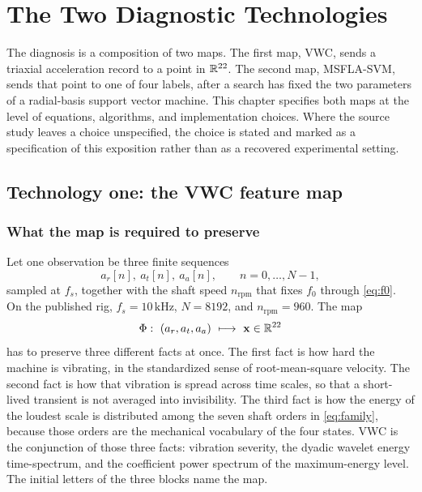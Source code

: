 \chapter{The Two Diagnostic Technologies}
\label{ch:methods}

The diagnosis is a composition of two maps.
The first map, VWC, sends a triaxial acceleration record to a point in \(\mathbb{R}^{22}\).
The second map, MSFLA-SVM, sends that point to one of four labels, after a search has fixed the two parameters of a radial-basis support vector machine.
This chapter specifies both maps at the level of equations, algorithms, and implementation choices.
Where the source study leaves a choice unspecified, the choice is stated and marked as a specification of this exposition rather than as a recovered experimental setting.

\section{Technology one: the VWC feature map}
\label{sec:vwc}

\subsection{What the map is required to preserve}

Let one observation be three finite sequences
\begin{equation}
a_{r}[n],\ a_{t}[n],\ a_{a}[n],\qquad n=0,\ldots,N-1,
\label{eq:triaxial}
\end{equation}
sampled at \(f_{s}\), together with the shaft speed \(n_{\mathrm{rpm}}\) that fixes \(f_{0}\) through \eqref{eq:f0}.
On the published rig, \(f_{s}=10\,\mathrm{kHz}\), \(N=8192\), and \(n_{\mathrm{rpm}}=960\).
The map
\begin{equation}
\Phi:\ (a_{r}, a_{t}, a_{a})\ \longmapsto\ \vect{x}\in\R^{22}
\label{eq:phi}
\end{equation}
has to preserve three different facts at once.
The first fact is how hard the machine is vibrating, in the standardized sense of root-mean-square velocity.
The second fact is how that vibration is spread across time scales, so that a short-lived transient is not averaged into invisibility.
The third fact is how the energy of the loudest scale is distributed among the seven shaft orders in \eqref{eq:family}, because those orders are the mechanical vocabulary of the four states.
VWC is the conjunction of those three facts: vibration severity, the dyadic wavelet energy time-spectrum, and the coefficient power spectrum of the maximum-energy level.
The initial letters of the three blocks name the map.

